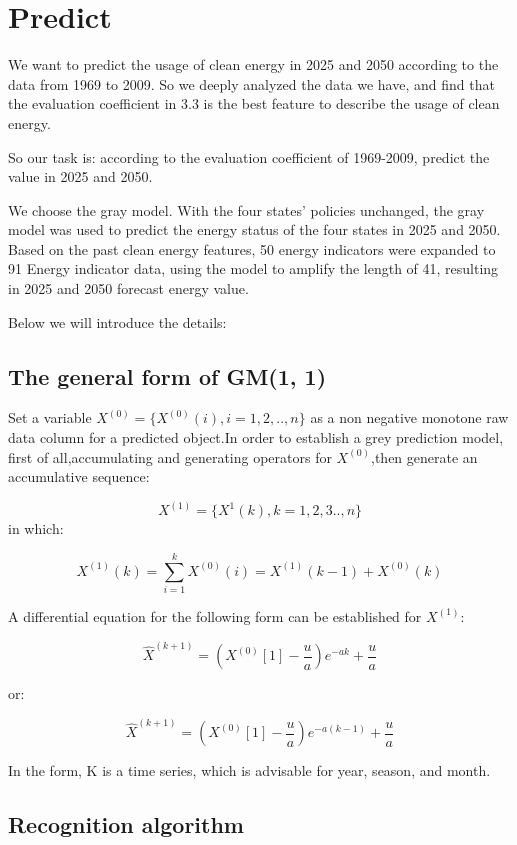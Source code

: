 \documentclass[a4paper]{article}
\begin{document}
\section{Predict}

We want to predict the usage of clean energy in 2025 and 2050 according to the data from 1969 to 2009. So we deeply analyzed the data we have, and find that the evaluation coefficient in 3.3 is the best feature to describe the usage of clean energy.

So our task is: according to the evaluation coefficient of 1969-2009, predict the value in 2025 and 2050.

We choose the gray model. With the four states' policies unchanged, the gray model was used to predict the energy status of the four states in 2025 and 2050. Based on the past clean energy features, 50 energy indicators were expanded to 91 Energy indicator data, using the model to amplify the length of 41, resulting in 2025 and 2050 forecast energy value.

Below we will introduce the details:

\subsection{The general form of GM(1, 1)}
Set a variable  $X^{(0)} = \{X^{(0)}(i), i=1,2,..,n\}$ as a non negative monotone raw data column for a predicted object.In order to establish a grey prediction model, first of all,accumulating and generating operators for $X^{(0)}$,then generate an accumulative sequence:

\[X^{(1)} = \{X^{1}(k), k=1,2,3..,n\}\] in which:

\[X^{(1)}(k) = \sum_{i=1}^{k}{X^{(0)}(i)}=X^{(1)}(k-1) + X^{(0)}(k)\]

A differential equation for the following form can be established for $X^{(1)}$:

\[\hat{X}^{(k+1)} = (X^{(0)}[1] - \frac{u}{a})e^{-ak} + \frac{u}{a}\]

or:

\[\hat{X}^{(k+1)} = (X^{(0)}[1] - \frac{u}{a})e^{-a(k-1)} + \frac{u}{a}\]

In the form, K is a time series, which is advisable for year, season, and month.

\subsection{Recognition algorithm}
\end{document}
